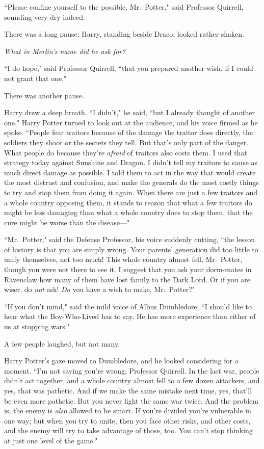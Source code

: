 ``Please confine yourself to the possible, Mr.~Potter," said Professor Quirrell, sounding very dry indeed.

There was a long pause; Harry, standing beside Draco, looked rather shaken.

\emph{What in Merlin's name did he ask for?}

``I do hope," said Professor Quirrell, ``that you prepared another wish, if I could not grant that one."

There was another pause.

Harry drew a deep breath. ``I didn't," he said, ``but I already thought of another one." Harry Potter turned to look out at the audience, and his voice firmed as he spoke. ``People fear traitors because of the damage the traitor does directly, the soldiers they shoot or the secrets they tell. But that's only part of the danger. What people do because they're \emph{afraid} of traitors also costs them. I used that strategy today against Sunshine and Dragon. I didn't tell my traitors to cause as much direct damage as possible. I told them to act in the way that would create the most distrust and confusion, and make the generals do the most costly things to try and stop them from doing it again. When there are just a few traitors and a whole country opposing them, it stands to reason that what a few traitors do might be less damaging than what a whole country does to stop them, that the cure might be worse than the disease—"

``Mr.~Potter," said the Defense Professor, his voice suddenly cutting, ``the lesson of history is that you are simply wrong. Your parents' generation did too little to unify themselves, not too much! This whole country almost fell, Mr.~Potter, though you were not there to see it. I suggest that you ask your dorm-mates in Ravenclaw how many of them have lost family to the Dark Lord. Or if you are wiser, do \emph{not} ask! \emph{Do} you have a wish to make, Mr.~Potter?"

``If you don't mind," said the mild voice of Albus Dumbledore, ``I should like to hear what the Boy-Who-Lived has to say. He has more experience than either of us at stopping wars."

A few people laughed, but not many.

Harry Potter's gaze moved to Dumbledore, and he looked considering for a moment. ``I'm not saying you're wrong, Professor Quirrell. In the last war, people didn't act together, and a whole country almost fell to a few dozen attackers, and yes, that was pathetic. And if we make the same mistake next time, yes, that'll be even more pathetic. But you never fight the same war twice. And the problem is, the enemy is \emph{also} allowed to be smart. If you're divided you're vulnerable in one way; but when you try to unite, then you face other risks, and other costs, and the enemy will try to take advantage of those, too. You can't stop thinking at just one level of the game."


